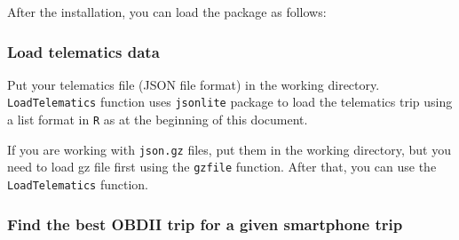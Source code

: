 \documentclass[letterpaper,9pt,twocolumn,twoside,]{pinp}
\begin{document}
After the installation, you can load the package as follows:

\begin{Shaded}
\begin{Highlighting}[]
\end{Highlighting}
\end{Shaded}

\hypertarget{load-telematics-data}{%
\subsubsection{Load telematics data}\label{load-telematics-data}}

Put your telematics file (JSON file format) in the working directory.
\texttt{LoadTelematics} function uses \texttt{jsonlite} package to load
the telematics trip using a list format in \texttt{R} as at the
beginning of this document.

\begin{Shaded}
\begin{Highlighting}[]
\StringTok{ }\NormalTok{(}\NormalTok{)}
\StringTok{ }\NormalTok{(}\NormalTok{)}
\end{Highlighting}
\end{Shaded}

If you are working with \texttt{json.gz} files, put them in the working
directory, but you need to load gz file first using the \texttt{gzfile}
function. After that, you can use the \texttt{LoadTelematics} function.

\begin{Shaded}
\begin{Highlighting}[]
\StringTok{ }\NormalTok{(}\NormalTok{)}
\StringTok{ }
\end{Highlighting}
\end{Shaded}

\hypertarget{find-the-best-obdii-trip-for-a-given-smartphone-trip}{%
\subsubsection{Find the best OBDII trip for a given smartphone
trip}\label{find-the-best-obdii-trip-for-a-given-smartphone-trip}}
\end{document}
